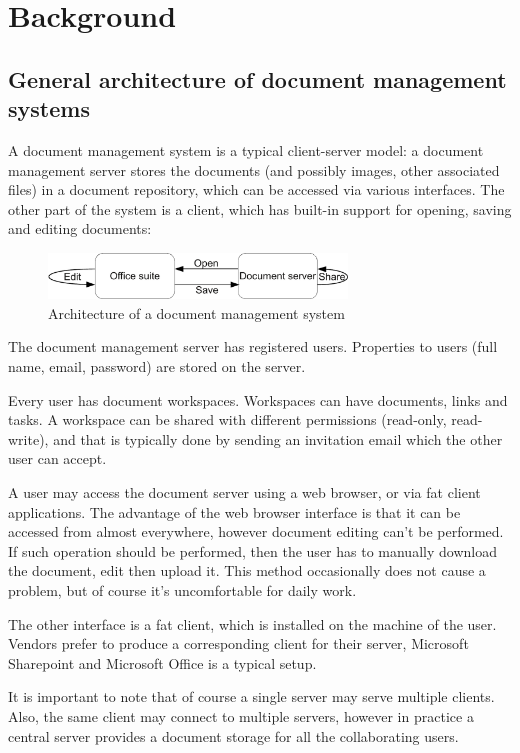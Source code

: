 \section{Background}

\subsection{General architecture of document management systems}

A document management system is a typical client-server model: a document
management server stores the documents (and possibly images, other associated
files) in a document repository, which can be accessed via various interfaces.
The other part of the system is a client, which has built-in support for
opening, saving and editing documents:

\begin{figure}[H]
\centering
\includegraphics[width=300px,keepaspectratio]{general-arch-of-doc-mgmt-systems.pdf}
\caption{Architecture of a document management system}
\end{figure}

The document management server has registered users. Properties to users (full
name, email, password) are stored on the server.

Every user has document workspaces. Workspaces can have documents, links and
tasks. A workspace can be shared with different permissions (read-only,
read-write), and that is typically done by sending an invitation email which
the other user can accept.

A user may access the document server using a web browser, or via fat client
applications. The advantage of the web browser interface is that it can be
accessed from almost everywhere, however document editing can't be performed.
If such operation should be performed, then the user has to manually download
the document, edit then upload it. This method occasionally does not cause a
problem, but of course it's uncomfortable for daily work.

The other interface is a fat client, which is installed on the machine of the
user. Vendors prefer to produce a corresponding client for their server,
Microsoft Sharepoint and Microsoft Office is a typical setup.

It is important to note that of course a single server may serve multiple
clients. Also, the same client may connect to multiple servers, however in
practice a central server provides a document storage for all the collaborating
users.

